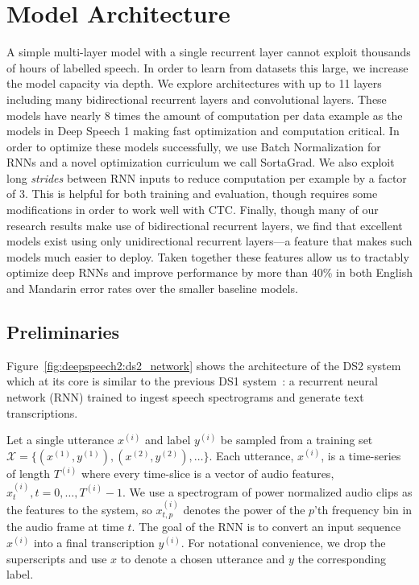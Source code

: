 \section{Model Architecture}
\label{sec:deepspeech2:model}

A simple multi-layer model with a single recurrent layer cannot exploit
thousands of hours of labelled speech. In order to learn from datasets this
large, we increase the model capacity via depth. We explore architectures with
up to 11 layers including many bidirectional recurrent layers and convolutional
layers. These models have nearly 8 times the amount of computation per data
example as the models in Deep Speech 1 making fast optimization and computation
critical. In order to optimize these models successfully, we use Batch
Normalization for RNNs and a novel optimization curriculum we call SortaGrad.
We also exploit long \emph{strides} between RNN inputs to reduce computation
per example by a factor of 3. This is helpful for both training and evaluation,
though requires some modifications in order to work well with CTC. Finally,
though many of our research results make use of bidirectional recurrent layers,
we find that excellent models exist using only unidirectional recurrent
layers---a feature that makes such models much easier to deploy.  Taken
together these features allow us to tractably optimize deep RNNs and improve
performance by more than 40\% in both English and Mandarin error rates over the
smaller baseline models.

\subsection{Preliminaries}

Figure~\ref{fig:deepspeech2:ds2_network} shows the architecture of the DS2
system which at its core is similar to the previous DS1
system~\cite{hannun2014deepspeech}: a recurrent neural network (RNN) trained to
ingest speech spectrograms and generate text transcriptions. 

Let a single utterance $x^{(i)}$ and label $y^{(i)}$ be sampled from a training
set $\mathcal{X} = \{(x^{(1)},y^{(1)}),(x^{(2)},y^{(2)}),\ldots\}$. Each
utterance, $x^{(i)}$, is a time-series of length $T^{(i)}$ where every
time-slice is a vector of audio features, $x_t^{(i)},  t=0,\ldots,T^{(i)}-1$.
We use a spectrogram of power normalized audio clips as the features to the
system, so $x^{(i)}_{t,p}$ denotes the power of the $p$'th frequency bin in the
audio frame at time $t$. The goal of the RNN is to convert an input sequence
$x^{(i)}$ into a final transcription $y^{(i)}$. For notational convenience, we
drop the superscripts and use $x$ to denote a chosen utterance and $y$ the
corresponding label.

